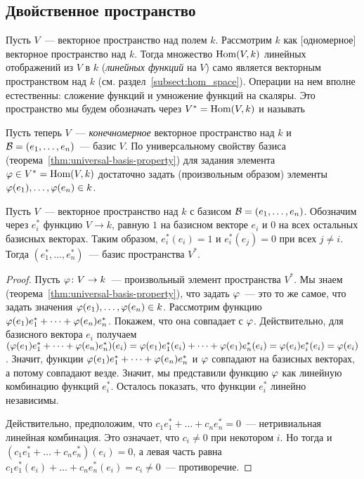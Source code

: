 \subsection{Двойственное пространство}


Пусть $V$~--- векторное пространство над полем $k$. Рассмотрим $k$ как
[одномерное] векторное пространство над $k$. Тогда множество
$\operatorname{Hom}(V,k)$ линейных отображений из $V$ в $k$ ({\it линейных функций}
на $V$) само является векторным пространством над $k$
(см. раздел~\ref{subsect:hom_space}). Операции на нем вполне
естественны: сложение функций и умножение функций на скаляры. Это
пространство мы будем обозначать через $V^* = \operatorname{Hom}(V,k)$ и называть

Пусть теперь $V$~--- {\it конечномерное} векторное пространство над
$k$ и $\mathcal B = (e_1,\dots,e_n)$~--- базис $V$. По универсальному
свойству базиса (теорема~\ref{thm:universal-basis-property}) для
задания элемента $\varphi\in V^* = \operatorname{Hom}(V,k)$ достаточно задать
(произвольным образом) элементы $\varphi(e_1),\dots,\varphi(e_n)\in k$.

\begin{proposition}
Пусть $V$~--- векторное пространство над $k$ с базисом
$\mathcal B = (e_1,\dots,e_n)$.
Обозначим через $e_i^*$ функцию $V\to k$, равную $1$ на
базисном векторе $e_i$ и $0$ на всех остальных базисных
векторах. Таким образом, $e_i^*(e_i) = 1$ и $e_i^*(e_j) = 0$ при всех
$j\neq i$.
Тогда $(e^*_1,\dots,e^*_n)$~--- базис пространства $V^*$.
\end{proposition}
\begin{proof}
Пусть $\varphi\colon V\to k$~--- произвольный элемент пространства
$V^*$. Мы знаем (теорема~\ref{thm:universal-basis-property}), что
задать $\varphi$~--- это то же самое, что задать значения
$\varphi(e_1),\dots,\varphi(e_n)\in k$. Рассмотрим функцию
$\varphi(e_1)e^*_1 + \dots + \varphi(e_n)e^*_n$. Покажем, что она совпадает с
$\varphi$.
Действительно, для базисного вектора $e_i$ получаем
$(\varphi(e_1)e^*_1 + \dots + \varphi(e_n)e^*_n)(e_i)
= \varphi(e_1)e^*_1(e_i) + \dots + \varphi(e_1)e^*_n(e_i)
= \varphi(e_i)e^*_i(e_i) = \varphi(e_i)$.
Значит, функции $\varphi(e_1)e^*_1 + \dots + \varphi(e_n)e^*_n$ и $\varphi$
совпадают на базисных векторах, а потому совпадают везде. Значит, мы
представили функцию $\varphi$ как линейную комбинацию функций
$e^*_i$. Осталось показать, что функции $e^*_i$ линейно независимы.

Действительно, предположим, что $c_1 e^*_1 + \dots + c_n e^*_n =
0$~--- нетривиальная линейная комбинация. Это означает, что
$c_i\neq 0$ при некотором $i$. Но тогда
и $(c_1 e^*_1 + \dots + c_n e^*_n)(e_i) = 0$, а левая часть
равна $c_1 e^*_1(e_i) + \dots + c_n e^*_n(e_i) = c_i\neq 0$~---
противоречие.
\end{proof}

